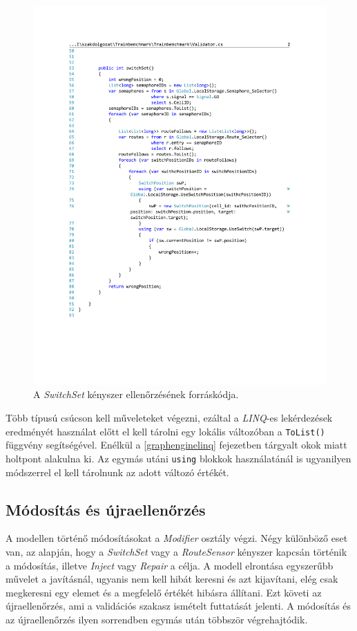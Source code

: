 \begin{figure}[H]
	\centering
	\includegraphics[width=\linewidth, keepaspectratio]{figures/Validator.pdf}
	\caption{A \emph{SwitchSet} kényszer ellenőrzésének forráskódja.}
	\label{fig:SwitchSetSource}
\end{figure}

Több típusú csúcson kell műveleteket végezni, ezáltal a \emph{LINQ}-es lekérdezések eredményét használat előtt el kell tárolni egy lokális változóban a \texttt{ToList()} függvény segítségével. Enélkül a \ref{graphenginelinq} fejezetben tárgyalt okok miatt holtpont alakulna ki. Az egymás utáni \texttt{using} blokkok használatánál is ugyanilyen módszerrel el kell tárolnunk az adott változó értékét.

\subsection{Módosítás és újraellenőrzés}

A modellen történő módosításokat a \emph{Modifier} osztály végzi. Négy különböző eset van, az alapján, hogy a \emph{SwitchSet} vagy a \emph{RouteSensor} kényszer kapcsán történik a módosítás, illetve \emph{Inject} vagy \emph{Repair} a célja. A modell elrontása egyszerűbb művelet a javításnál, ugyanis nem kell hibát keresni és azt kijavítani, elég csak megkeresni egy elemet és a megfelelő értékét hibásra állítani. Ezt követi az újraellenőrzés, ami a validációs szakasz ismételt futtatását jelenti. A módosítás és az újraellenőrzés ilyen sorrendben egymás után többször végrehajtódik.

